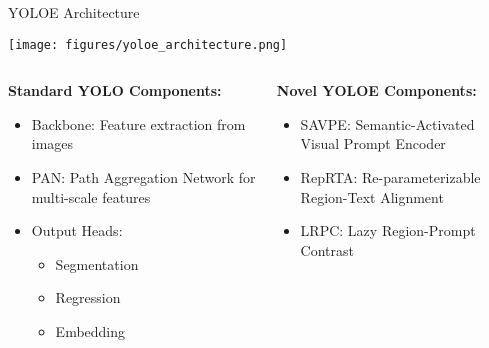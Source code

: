 \documentclass{beamer}
\begin{document}
\begin{frame}{YOLOE Architecture}
    \begin{center}
        \texttt{[image: figures/yoloe\_architecture.png]}
    \end{center}
    
    \begin{columns}[T]
        \begin{column}{0.48\textwidth}
            \textbf{Standard YOLO Components:}
            \begin{itemize}\small
                \item \textcolor{ubburgundy}{Backbone}: Feature extraction from images
                \item \textcolor{ubburgundy}{PAN}: Path Aggregation Network for multi-scale features
                \item \textcolor{ubburgundy}{Output Heads}:
                \begin{itemize}\footnotesize
                    \item Segmentation%
                    \item Regression%
                    \item Embedding%
                \end{itemize}
            \end{itemize}
        \end{column}
        
        \begin{column}{0.48\textwidth}
            \textbf{Novel YOLOE Components:}
            \begin{itemize}\small
                \item \textcolor{ubburgundy}{SAVPE}: Semantic-Activated Visual Prompt Encoder
                \item \textcolor{ubburgundy}{RepRTA}: Re-parameterizable Region-Text Alignment 
                \item \textcolor{ubburgundy}{LRPC}: Lazy Region-Prompt Contrast
            \end{itemize}
        \end{column}
    \end{columns}
\end{frame}
\end{document}
